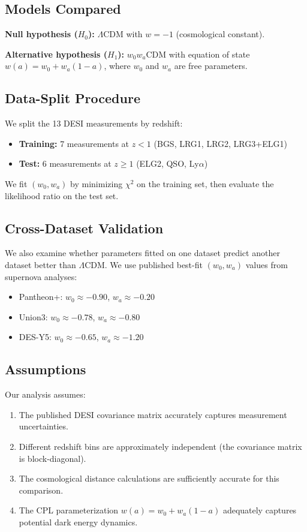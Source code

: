 \documentclass[11pt,a4paper]{article}
\newcommand{\LCDM}{$\Lambda$CDM}
\begin{document}
\subsection{Models Compared}

\textbf{Null hypothesis ($H_0$):} \LCDM{} with $w = -1$ (cosmological constant).

\textbf{Alternative hypothesis ($H_1$):} $w_0w_a$CDM with equation of state $w(a) = w_0 + w_a(1-a)$, where $w_0$ and $w_a$ are free parameters.

\subsection{Data-Split Procedure}

We split the 13 DESI measurements by redshift:
\begin{itemize}
    \item \textbf{Training:} 7 measurements at $z < 1$ (BGS, LRG1, LRG2, LRG3+ELG1)
    \item \textbf{Test:} 6 measurements at $z \geq 1$ (ELG2, QSO, Ly$\alpha$)
\end{itemize}

We fit $(w_0, w_a)$ by minimizing $\chi^2$ on the training set, then evaluate the likelihood ratio on the test set.

\subsection{Cross-Dataset Validation}

We also examine whether parameters fitted on one dataset predict another dataset better than \LCDM. We use published best-fit $(w_0, w_a)$ values from supernova analyses:
\begin{itemize}
    \item Pantheon+: $w_0 \approx -0.90$, $w_a \approx -0.20$
    \item Union3: $w_0 \approx -0.78$, $w_a \approx -0.80$
    \item DES-Y5: $w_0 \approx -0.65$, $w_a \approx -1.20$
\end{itemize}

\subsection{Assumptions}

Our analysis assumes:
\begin{enumerate}
    \item The published DESI covariance matrix accurately captures measurement uncertainties.
    \item Different redshift bins are approximately independent (the covariance matrix is block-diagonal).
    \item The cosmological distance calculations are sufficiently accurate for this comparison.
    \item The CPL parameterization $w(a) = w_0 + w_a(1-a)$ adequately captures potential dark energy dynamics.
\end{enumerate}
\end{document}
